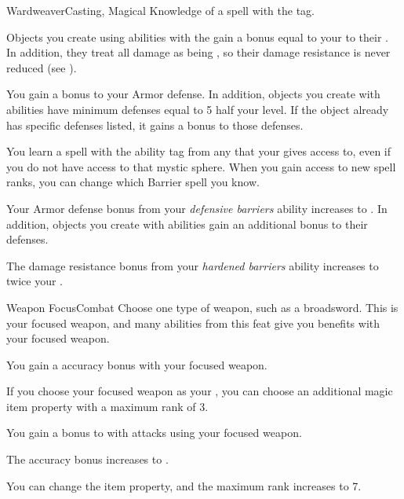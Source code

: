     \begin{magicalfeat}{Wardweaver}{Casting, Magical}
        \featpre Knowledge of a spell with the  tag.

         Objects you create using abilities with the   gain a bonus equal to your  to their .
        In addition, they treat all damage as being , so their damage resistance is never reduced (see ).

         You gain a  bonus to your Armor defense.
        In addition, objects you create with  abilities have minimum defenses equal to 5 \add half your level.
        If the object already has specific defenses listed, it gains a  bonus to those defenses.

         You learn a spell with the  ability tag from any  that your  gives access to, even if you do not have access to that mystic sphere.
        When you gain access to new spell ranks, you can change which Barrier spell you know.

         Your Armor defense bonus from your \textit{defensive barriers} ability increases to .
        In addition, objects you create with  abilities gain an additional  bonus to their defenses.

         The damage resistance bonus from your \textit{hardened barriers} ability increases to twice your .
    \end{magicalfeat}

    \begin{feat}{Weapon Focus}{Combat}
         Choose one type of weapon, such as a broadsword.
        This is your focused weapon, and many abilities from this feat give you benefits with your focused weapon.

         You gain a  accuracy bonus with your focused weapon.

         If you choose your focused weapon as your , you can choose an additional magic item property with a maximum rank of 3.

         You gain a  bonus to  with attacks using your focused weapon.

         The accuracy bonus increases to .

         You can change the item property, and the maximum rank increases to 7.
    \end{feat}

